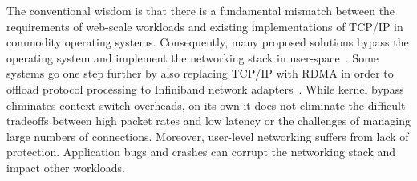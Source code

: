 
The conventional wisdom is that there is a fundamental mismatch
between the requirements of web-scale workloads and existing
implementations of TCP/IP  in commodity operating
systems. Consequently, many proposed solutions bypass the operating
system and implement the networking stack in
user-space~\cite{jeong2014mtcp,Kapoor:2012:CPL,openonload,marinos2013network,Thekkath:1993:INP}. Some
systems go one step further by also replacing TCP/IP with RDMA in
order to offload protocol processing to Infiniband network
adapters~\cite{DBLP:conf/sosp/OngaroRSOR11,Jose:2011:MDH,mitchell:rdma,dragojevic14farm}. While
kernel bypass eliminates context switch overheads, on its own it does
not eliminate the difficult tradeoffs between high packet rates and
low latency or the challenges of managing large numbers of
connections. Moreover, user-level networking suffers from lack of
protection. Application bugs and crashes can corrupt the networking
stack and impact other workloads.

